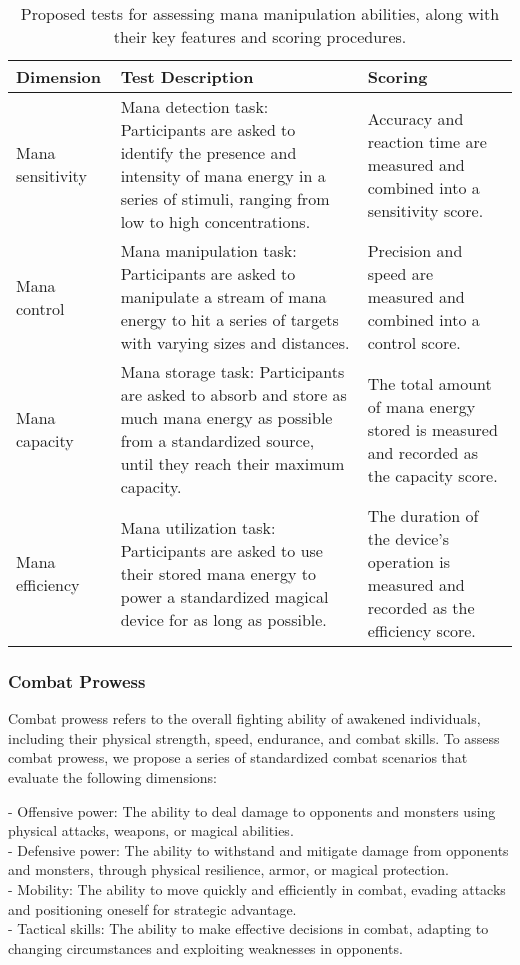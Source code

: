 \documentclass[12pt, a4paper]{article}
\begin{document}
\begin{table}[ht]
\centering
\begin{tabular}{p{}|p{}|p{}} 
 \hline
 Dimension & Test Description & Scoring \\ 
 \hline
 Mana sensitivity & Mana detection task: Participants are asked to identify the presence and intensity of mana energy in a series of stimuli, ranging from low to high concentrations. & Accuracy and reaction time are measured and combined into a sensitivity score. \\ 
 \hline
 Mana control & Mana manipulation task: Participants are asked to manipulate a stream of mana energy to hit a series of targets with varying sizes and distances. & Precision and speed are measured and combined into a control score. \\
 \hline
 Mana capacity & Mana storage task: Participants are asked to absorb and store as much mana energy as possible from a standardized source, until they reach their maximum capacity. & The total amount of mana energy stored is measured and recorded as the capacity score. \\
 \hline
 Mana efficiency & Mana utilization task: Participants are asked to use their stored mana energy to power a standardized magical device for as long as possible. & The duration of the device's operation is measured and recorded as the efficiency score. \\
 \hline
\end{tabular}
\caption{Proposed tests for assessing mana manipulation abilities, along with their key features and scoring procedures.}
\label{tab:mana}
\end{table}

\subsubsection{Combat Prowess}

Combat prowess refers to the overall fighting ability of awakened individuals, including their physical strength, speed, endurance, and combat skills. To assess combat prowess, we propose a series of standardized combat scenarios that evaluate the following dimensions:

- Offensive power: The ability to deal damage to opponents and monsters using physical attacks, weapons, or magical abilities.\\
- Defensive power: The ability to withstand and mitigate damage from opponents and monsters, through physical resilience, armor, or magical protection.\\
- Mobility: The ability to move quickly and efficiently in combat, evading attacks and positioning oneself for strategic advantage.\\
- Tactical skills: The ability to make effective decisions in combat, adapting to changing circumstances and exploiting weaknesses in opponents.\\
\end{document}
